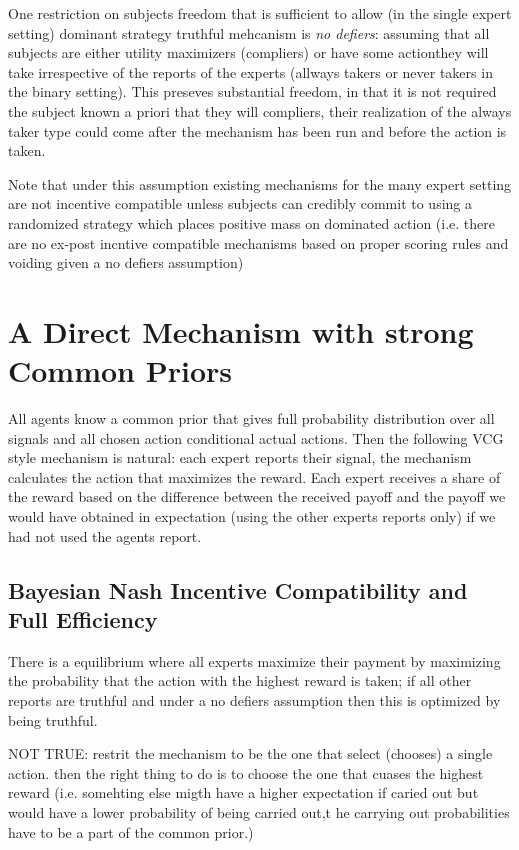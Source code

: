 One restriction on subjects freedom that is sufficient to allow (in the single expert setting) dominant strategy truthful mehcanism is \emph{no defiers}: assuming that all subjects are either utility maximizers (compliers) or have some actionthey will take irrespective of the reports of the experts (allways takers or never takers in the binary setting).
This preseves substantial freedom, in that it is not required the subject known a priori that they will compliers, their realization of the always taker type could come after the mechanism has been run and before the action is taken. 

Note that under this assumption existing mechanisms for the many expert setting are not incentive compatible unless subjects can credibly commit to using a randomized strategy which places positive mass on dominated action (i.e. there are no ex-post incntive compatible mechanisms based on proper scoring rules and voiding given a no defiers assumption)





\section{A Direct Mechanism with strong Common Priors}

All agents know a common prior that gives full probability distribution over all signals and all chosen action conditional actual actions. 
Then the following VCG style mechanism is natural: each expert reports their signal, the mechanism calculates the action that maximizes the reward. Each expert receives a share of the reward based on the difference between the received payoff and the payoff we would have obtained in expectation (using the other experts reports only) if we had not used the agents report.


\subsection{Bayesian Nash Incentive Compatibility and Full Efficiency}

There is a  equilibrium where all experts maximize their payment by maximizing the probability that the action with the highest reward is taken; if all other reports are truthful and under a no defiers assumption then this is optimized by being truthful.


NOT TRUE: restrit the mechanism to be the one that select (chooses) a single action. then the right thing to do is to choose the one that cuases the highest reward (i.e. somehting else migth have a higher expectation if caried out but would have a lower probability of being carried out,t he carrying out probabilities have to be a part of the common prior.)


